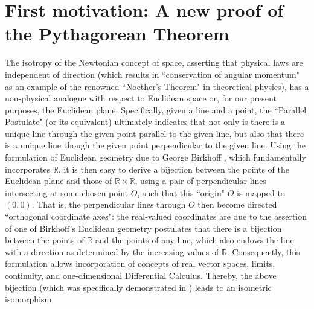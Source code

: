 \documentclass{amsart}
\numberwithin{equation}{section}
\theoremstyle{definition}
\numberwithin{theorem}{section}
\begin{document}
\bigskip

\appendix

 \section{First motivation: A  new proof of the Pythagorean Theorem}    The isotropy of the Newtonian concept of space, asserting that physical laws are independent of direction (which results in ``conservation of angular momentum" as an example of the renowned ``Noether's Theorem" in theoretical physics), has a non-physical analogue with respect to Euclidean space or, for our present purposes, the Euclidean plane.  Specifically, given a line and a point, the ``Parallel Postulate" (or its equivalent) ultimately indicates that not only is there is a unique line through the given point parallel to the given line, but also that there is a unique line though the given point perpendicular to the given line.  Using the formulation of Euclidean geometry due to George Birkhoff \cite{birkhoff:1932}, which fundamentally incorporates $\mathbb{R}$, it is then easy to derive a bijection between the points of the Euclidean plane and those of $\mathbb{R}\times\mathbb{R}$, using a pair of perpendicular lines intersecting at some chosen point $O$, such that this ``origin" $O$ is mapped to $(0,0)$.  That is, the perpendicular lines through $O$ then become directed ``orthogonal coordinate axes": the real-valued coordinates are due to the assertion of one of Birkhoff's Euclidean geometry postulates that there is a bijection between the points of $\mathbb{R}$ and the points of any line, which also endows the line with a direction as determined by the increasing values of $\mathbb{R}$.  Consequently, this formulation allows incorporation of concepts of real vector spaces, limits, continuity, and one-dimensional Differential Calculus.  Thereby, the above bijection (which was specifically demonstrated in \cite{birkhoff:1932}) leads to an isometric isomorphism. 
\end{document}
